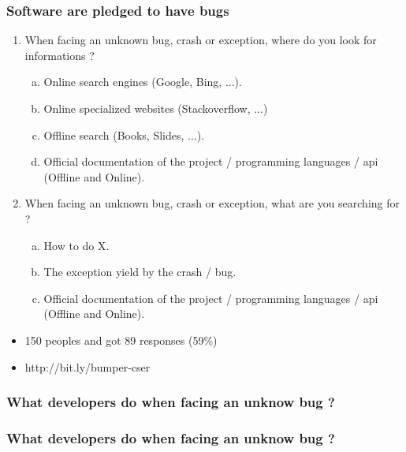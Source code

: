 \documentclass{beamer}
\begin{document}
\begin{frame}
\frametitle{Software are pledged to have bugs}


\vspace{0.3cm}
\begin{enumerate}
  \item When facing an unknown bug, crash or exception, where do you look for informations ?
  \begin{enumerate}[a)]
    \item Online search engines (Google, Bing, ...).
    \item Online specialized websites (Stackoverflow, ...)
    \item Offline search (Books, Slides, ...).
    \item Official documentation of the project / programming languages / api (Offline and Online).
  \end{enumerate}
  \item When facing an unknown bug, crash or exception, what are you searching for ?
  \begin{enumerate}[a)]
    \item How to do X.
    \item The exception yield by the crash / bug.
    \item Official documentation of the project / programming languages / api (Offline and Online).
  \end{enumerate}
 
\end{enumerate}
\begin{itemize}
\item 150 peoples and got 89 responses (59\%)
\item http://bit.ly/bumper-cser
\end{itemize}
\end{frame}

\begin{frame}
\frametitle{What developers do when facing an unknow bug ?}





\end{frame}

\begin{frame}
\frametitle{What developers do when facing an unknow bug ?}





\end{frame}
\end{document}
